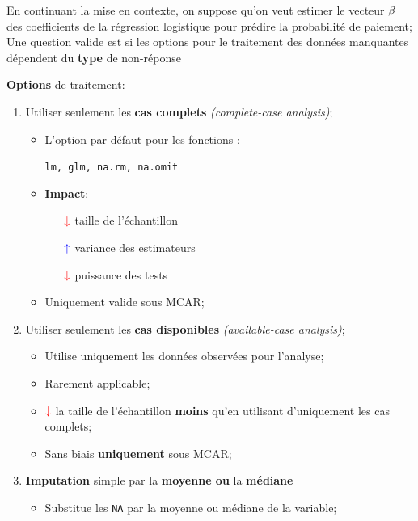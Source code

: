 \documentclass[10pt, french]{article}
\begin{document}
\begin{multicols*}{3}
En continuant la mise en contexte, on suppose qu'on veut estimer le vecteur $\mathbf{\beta}$ des coefficients de la régression logistique pour prédire la probabilité de paiement;
Une question valide est si les options pour le traitement des données manquantes dépendent du \textbf{type} de non-réponse

\textbf{Options} de traitement:
\begin{enumerate}
	\item	Utiliser seulement les \textbf{cas complets} \textit{(complete-case analysis)};
		\begin{itemize}
		\item	L'option par défaut pour les fonctions :
			\begin{center}
			\texttt{lm, glm, na.rm, na.omit}
			\end{center}
		\item	\textbf{Impact}:
			\begin{itemize}
			\item[$\color{red}\downarrow$]	taille de l'échantillon	\\
			\item[$\color{blue}\uparrow$]	variance des estimateurs	\\
			\item[$\color{red}\downarrow$]	puissance des tests	\\
			\end{itemize}
		\item	Uniquement valide sous \textcolor{ao(english)}{MCAR};
		\end{itemize}
	\item	Utiliser seulement les \textbf{cas disponibles} \textit{(available-case analysis)};
		\begin{itemize}
		\item	Utilise uniquement les données observées pour l'analyse;
		\item	Rarement applicable;
		\item	$\color{red}\downarrow$ la taille de l'échantillon \textbf{moins} qu'en utilisant d'uniquement les cas complets;
		\item	\textcolor{ao(english)}{Sans biais} \textbf{uniquement} sous \textcolor{ao(english)}{MCAR};
		\end{itemize}
	\item	\textbf{Imputation} simple par la \textbf{moyenne ou} la \textbf{médiane}
		\begin{itemize}
		\item	Substitue les \texttt{NA} par la moyenne ou médiane de la variable;

\end{itemize}
\end{enumerate}
\end{multicols*}
\end{document}
